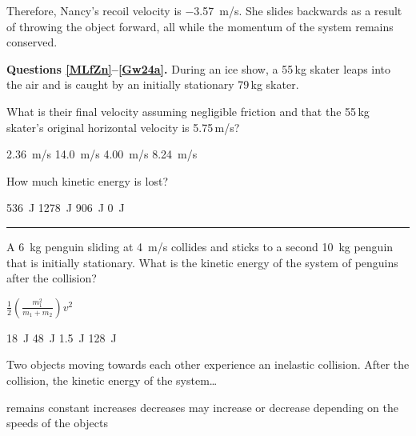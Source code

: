 \documentclass[]{exam}
\begin{document}
\begin{questions}
\begin{solution}
Therefore, Nancy's recoil velocity is \SI{-3.57}{m/s}. She slides backwards as a result of throwing the object forward, all while the momentum of the system remains conserved.
\end{solution}

\begin{EnvUplevel} %
    \textbf{Questions \ref{MLfZn}--\ref{Gw24a}.} During an ice show, a 55\,kg skater leaps into the air and is caught by an initially stationary 79\,kg skater. 
\end{EnvUplevel}
     
\question \label{MLfZn}
What is their final velocity assuming negligible friction and that the 55\,kg skater's original horizontal velocity is 5.75\,m/s? 
 
\begin{randomizechoices}
    \correctchoice \SI{2.36}{m/s}
    \choice \SI{14.0}{m/s}
    \choice \SI{4.00}{m/s}
    \choice \SI{8.24}{m/s}
\end{randomizechoices}
 
\question \label{Gw24a}
How much kinetic energy is lost?
 
\begin{randomizechoices}
    \correctchoice \SI{536}{J}
    \choice \SI{1278}{J}
    \choice \SI{906}{J}
    \choice \SI{0}{J}
\end{randomizechoices}

\bigskip

\hrule

\question \label{copy of 4.4 Q7 Inelastic collisions - final kinetic energy}

A \SI{6}{kg} penguin sliding at \SI{4}{m/s} collides and sticks to a second \SI{10}{kg} penguin that is initially stationary. What is the kinetic energy of the system of penguins after the collision?

\ifprintanswers
{\color{red}
$\displaystyle \frac{1}{2} \left(\frac{m_1^2}{m_1 + m_2}\right) v^2$
}
\medskip
\fi

\begin{randomizechoices}
    \correctchoice \SI{18}{J}
    \choice \SI{48}{J}
    \choice \SI{1.5}{J}
    \choice \SI{128}{J}
\end{randomizechoices}



\question
Two objects moving towards each other experience an inelastic collision. After the collision, the kinetic energy of the system\dots    
 
\begin{randomizechoices}[keeplast]
    \choice remains constant
    \choice increases
    \correctchoice decreases
    \choice may increase or decrease depending on the speeds of the objects
\end{randomizechoices}


\end{questions}
\end{document}
